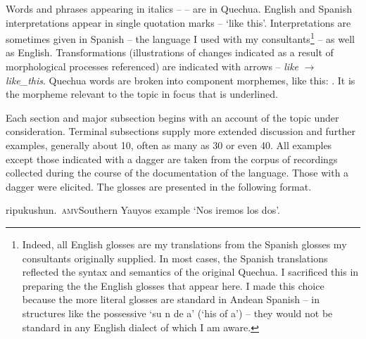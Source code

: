 Words and phrases appearing in italics --  -- are in Quechua. English and Spanish interpretations appear in single quotation marks -- `like this'. Interpretations are sometimes given in Spanish -- the language I used with my consultants\footnote{Indeed, all English glosses are my translations from the Spanish glosses my consultants originally supplied. In most cases, the Spanish translations reflected the syntax and semantics of the original Quechua. I sacrificed this in preparing the the English glosses that appear here. I made this choice because the more literal glosses are standard in Andean Spanish -- in structures like the possessive `su n de a' (`his  of a') -- they would not be standard in any English dialect of which I am aware.} -- as well as English. Transformations (illustrations of changes indicated as a result of morphological processes referenced) are indicated with arrows -- \textit{like} $\rightarrow$ \textit{like\_this}. Quechua words are broken into component morphemes, like this: . It is the morpheme relevant to the topic in focus that is underlined. 

Each section and major subsection begins with an account of the topic under consideration. Terminal subsections supply more extended discussion and further examples, generally about 10, often as many as 30 or even 40. All examples except those indicated with a dagger are taken from the corpus of recordings collected during the course of the documentation of the language. Those with a dagger were elicited. The glosses are presented in the following format.\\[1ex]

\begin{footnotesize}
\gloexe{}{}{}%
{ ripukushun.~{\textsc{\textup{amv}}}\hspace{29.5ex}Southern Yauyos example}%
{\hspace{23ex}}%
%
{`Nos iremos los dos'.}%
{}{}%
\end{footnotesize}

